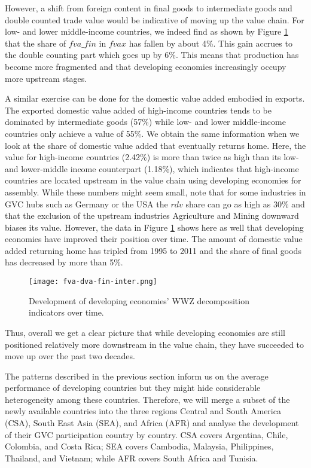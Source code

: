 \documentclass[a4paper,11pt]{article}
\begin{document}
However, a shift from foreign content in final goods to intermediate goods and double counted trade value would be indicative of moving up the value chain. For low- and lower middle-income countries, we indeed find as shown by Figure \ref{fig:llmwwz} that the share of $fva\_fin$ in $fvax$ has fallen by about 4\%. This gain accrues to the double counting part which goes up by 6\%. This means that production has become more fragmented and that developing economies increasingly occupy more upstream stages.

A similar exercise can be done for the domestic value added embodied in exports. The exported domestic value added of high-income countries tends to be dominated by intermediate goods (57\%) while low- and lower middle-income countries only achieve a value of 55\%. We obtain the same information when we look at the share of domestic value added that eventually returns home. Here, the value for high-income countries (2.42\%) is more than twice as high than its low- and lower-middle income counterpart (1.18\%), which indicates that high-income countries are located upstream in the value chain using developing economies for assembly. While these numbers might seem small, note that for some industries in GVC hubs such as Germany or the USA the $rdv$ share can go as high as 30\% and that the exclusion of the upstream industries Agriculture and Mining downward biases its value. However, the data in Figure \ref{fig:llmwwz} shows here as well that developing economies have improved their position over time. The amount of domestic value added returning home has tripled from 1995 to 2011 and the share of final goods has decreased by more than 5\%. 

\begin{figure}
\centering
\texttt{[image: fva-dva-fin-inter.png]}
\caption{Development of developing economies' WWZ decomposition indicators over time.}
\label{fig:llmwwz}
\end{figure}

Thus, overall we get a clear picture that while developing economies are still positioned relatively more downstream in the value chain, they have succeeded to move up over the past two decades.

The patterns described in the previous section inform us on the average performance of developing countries but they might hide considerable heterogeneity among these countries. Therefore, we will merge a subset of the newly available countries into the three regions Central and South America (CSA), South East Asia (SEA), and Africa (AFR) and analyse the development of their GVC participation country by country. CSA covers Argentina, Chile, Colombia, and Costa Rica; SEA covers Cambodia, Malaysia, Philippines, Thailand, and Vietnam; while AFR covers South Africa and Tunisia.\\\
\end{document}

